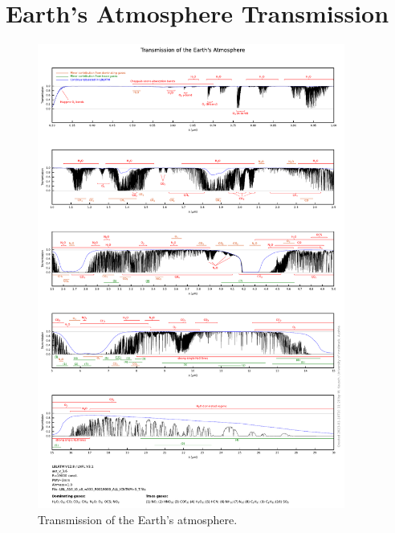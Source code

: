 % 
\section{Earth's Atmosphere Transmission}\label{app:atmo_trans}

\begin{figure}[ht]
  \centering
  \includegraphics[width=0.9\textwidth]{figures/transmission_molecs_ALL_labelled.pdf}
  \caption{Transmission of the Earth's atmosphere.}
  \label{Fig:atmo_trans}
\end{figure}